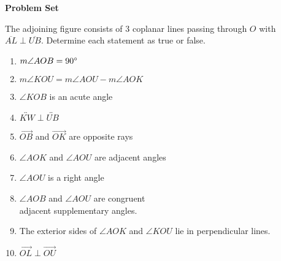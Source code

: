 \textbf{Problem Set}

\vspce

The adjoining figure consists of 3 coplanar lines passing through $O$ with $\overline{AL} \perp \overline{UB}$. Determine each statement as true or false.

{\begin{enumerate}[label = \arabic*. ]
\item	$m\angle{AOB}=90\degree$ 
\item	$m\angle{KOU}= m\angle{AOU} - m\angle{AOK}$ 
\item	$\angle{KOB}$ is an acute angle
\item	$\overleftrightarrow{KW} \perp \overleftrightarrow{UB}$ 
\item	$\overrightarrow{OB}$ and $\overrightarrow{OK}$ are opposite rays 
\item	$\angle{AOK}$ and $\angle{AOU}$ are adjacent angles
\item	$\angle{AOU}$ is a right angle
\item	$\angle{AOB}$ and $\angle{AOU}$ are congruent\\ adjacent supplementary angles.
\item	The exterior sides of $\angle{AOK}$ and $\angle{KOU}$ lie in perpendicular lines.
\item	$\overrightarrow{OL} \perp \overrightarrow{OU} $
\end{enumerate}}

\vspace*{-14.5em}\hspace*{18em} 
\vspace*{2em}


     





